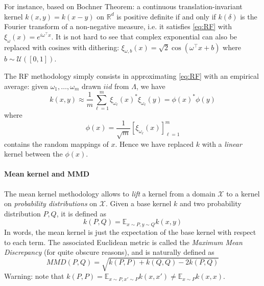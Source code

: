 \documentclass{article}
\begin{document}
For instance, based on Bochner Theorem: a continuous translation-invariant kernel $k(x,y)=k(x-y)$ on $\mathbb{R}^d$ is positive
definite if and only if $k(\delta)$ is the Fourier transform of a non-negative measure, i.e. it satisfies \eqref{eq:RF} with $\xi_\omega(x) = e^{i\omega^\top x}$. It is not hard to see that complex exponential can also be replaced with cosines with dithering: $\xi_{\omega, b}(x) = \sqrt{2}\cos(\omega^\top x + b)$ where $b \sim \mathcal{U}([0,1])$.

The RF methodology simply consists in approximating \eqref{eq:RF} with an empirical average: given $\omega_1, \ldots, \omega_m$ drawn $iid$ from $\Lambda$, we have
\begin{equation}\label{eq:RF_approx}
k(x,y) \approx \frac{1}{m}\sum_{\ell=1}^m \xi_{\omega_\ell}(x)^* \xi_{\omega_\ell}(y) = \phi(x)^* \phi(y)
\end{equation}
where
\[
\phi(x) = \frac{1}{\sqrt{m}}\left[\xi_{\omega_\ell}(x)\right]_{\ell=1}^m
\]
contains the random mappings of $x$. Hence we have replaced $k$ with a \emph{linear} kernel between the $\phi(x)$.

\paragraph{Mean kernel and MMD} The mean kernel methodology allows to \emph{lift} a kernel from a domain $\mathcal{X}$ to a kernel on \emph{probability distributions} on $\mathcal{X}$. Given a base kernel $k$ and two probability distribution $P,Q$, it is defined as
\begin{equation}\label{eq:mean_kernel}
k(P,Q) = \mathbb{E}_{x \sim P, y \sim Q} k(x,y)
\end{equation}
In words, the mean kernel is just the expectation of the base kernel with respect to each term. The associated Euclidean metric is called the \emph{Maximum Mean Discrepancy} (for quite obscure reasons), and is naturally defined as
\begin{equation}\label{eq:MMD}
MMD(P,Q) = \sqrt{k(P,P) + k(Q,Q) - 2k(P,Q)}
\end{equation}
Warning: note that $k(P,P) = \mathbb{E}_{x \sim P, x' \sim P} k(x,x') \neq \mathbb{E}_{x \sim P} k(x,x)$.
\end{document}
